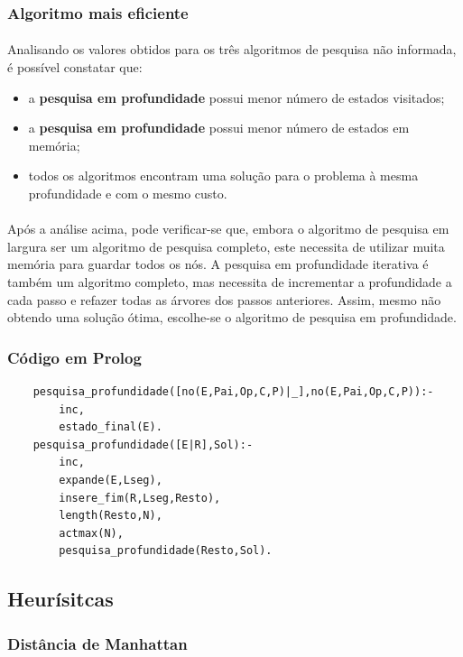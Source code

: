 \documentclass{article}
\begin{document}
\subsubsection{Algoritmo mais eficiente}
\paragraph{} Analisando os valores obtidos para os três algoritmos de pesquisa não informada, é possível constatar que:
\begin{itemize}
  \item a \textbf{pesquisa em profundidade} possui menor número de estados visitados;
  \item a \textbf{pesquisa  em profundidade} possui menor número de estados em memória;
  \item todos os algoritmos encontram uma solução para o problema à mesma profundidade e com o mesmo custo.
\end{itemize}
\paragraph{} Após a análise acima, pode verificar-se que, embora o algoritmo de pesquisa em largura ser um algoritmo de pesquisa completo, este necessita de utilizar muita memória para guardar todos os nós. A pesquisa em profundidade iterativa é também um algoritmo completo, mas necessita de incrementar a profundidade a cada passo e refazer todas as árvores dos passos anteriores. Assim, mesmo não obtendo uma solução ótima, escolhe-se o algoritmo de pesquisa em profundidade.

\subsubsection{Código em Prolog}
\begin{verbatim}
    pesquisa_profundidade([no(E,Pai,Op,C,P)|_],no(E,Pai,Op,C,P)):-
        inc,
        estado_final(E).
    pesquisa_profundidade([E|R],Sol):-
        inc,
        expande(E,Lseg),
        insere_fim(R,Lseg,Resto),
        length(Resto,N),
        actmax(N),
        pesquisa_profundidade(Resto,Sol).
\end{verbatim}

\subsection{Heurísitcas}
\subsubsection{Distância de Manhattan}
\end{document}
